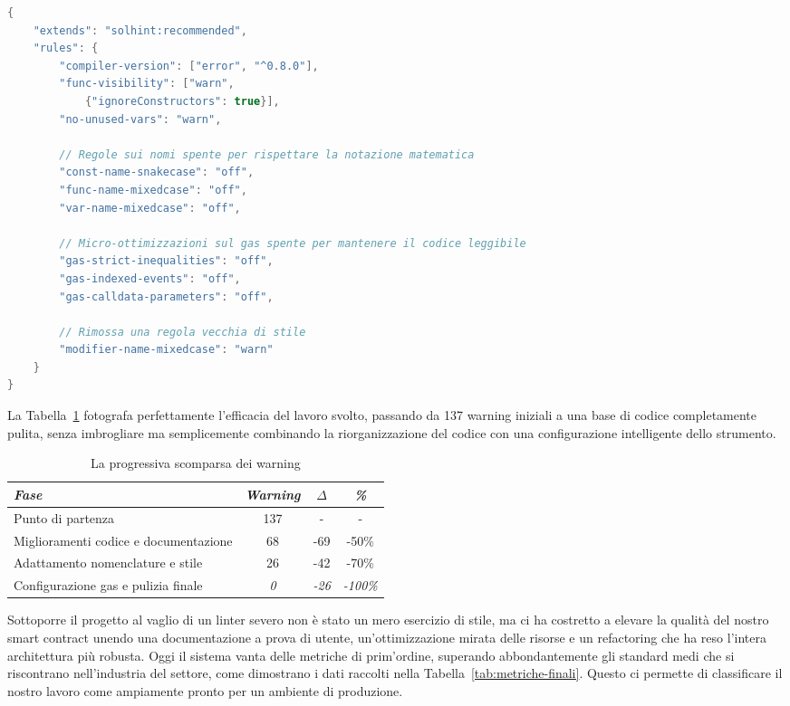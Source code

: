 \begin{lstlisting}[language=Java, caption={Il file .solhint.json completo e ottimizzato}, label=lst:solhint-finale]
{
    "extends": "solhint:recommended",
    "rules": {
        "compiler-version": ["error", "^0.8.0"],
        "func-visibility": ["warn", 
            {"ignoreConstructors": true}],
        "no-unused-vars": "warn",
        
        // Regole sui nomi spente per rispettare la notazione matematica
        "const-name-snakecase": "off",
        "func-name-mixedcase": "off",
        "var-name-mixedcase": "off",
        
        // Micro-ottimizzazioni sul gas spente per mantenere il codice leggibile
        "gas-strict-inequalities": "off",
        "gas-indexed-events": "off",
        "gas-calldata-parameters": "off",
        
        // Rimossa una regola vecchia di stile
        "modifier-name-mixedcase": "warn"
    }
}
\end{lstlisting}

La Tabella~\ref{tab:evoluzione-warning} fotografa perfettamente l'efficacia del lavoro svolto, passando da 137 warning iniziali a una base di codice completamente pulita, senza imbrogliare ma semplicemente combinando la riorganizzazione del codice con una configurazione intelligente dello strumento.

\begin{table}[H]
\centering
\caption{La progressiva scomparsa dei warning}
\label{tab:evoluzione-warning}
\begin{tabular}{lccc}
\toprule
\textit{Fase} & \textit{Warning} & \textit{$\Delta$} & \textit{\%} \\
\midrule
Punto di partenza & 137 & - & - \\
Miglioramenti codice e documentazione & 68 & -69 & -50\% \\
Adattamento nomenclature e stile & 26 & -42 & -70\% \\
Configurazione gas e pulizia finale & \textit{0} & \textit{-26} & \textit{-100\%} \\
\bottomrule
\end{tabular}
\end{table}

Sottoporre il progetto al vaglio di un linter severo non è stato un mero esercizio di stile, ma ci ha costretto a elevare la qualità del nostro smart contract unendo una documentazione a prova di utente, un'ottimizzazione mirata delle risorse e un refactoring che ha reso l'intera architettura più robusta. Oggi il sistema vanta delle metriche di prim'ordine, superando abbondantemente gli standard medi che si riscontrano nell'industria del settore, come dimostrano i dati raccolti nella Tabella~\ref{tab:metriche-finali}. Questo ci permette di classificare il nostro lavoro come ampiamente pronto per un ambiente di produzione.

